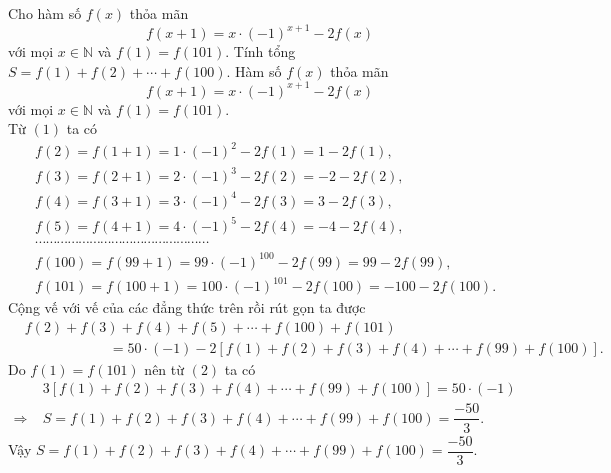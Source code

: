 \begin{vn}
Cho hàm số $f(x)$ thỏa mãn \[f(x+1)=x\cdot (-1)^{x+1}-2f(x)\] với mọi $x\in\mathbb{N}$ và $f(1)=f(101)$. Tính tổng $S=f(1)+f(2)+\cdots+f(100).$
\loigiai
{
Hàm số $f(x)$ thỏa mãn \[f(x+1)=x\cdot (-1)^{x+1}-2f(x)\tag{1}\] với mọi $x\in\mathbb{N}$ và $f(1)=f(101)$.\\
Từ $(1)$ ta có
{\allowdisplaybreaks
\begin{align*}
&f(2)=f(1+1)=1\cdot (-1)^{2}-2f(1)=1-2f(1),\\ 
&f(3)=f(2+1)=2\cdot (-1)^{3}-2f(2)=-2-2f(2),\\ 
&f(4)=f(3+1)=3\cdot (-1)^{4}-2f(3)=3-2f(3),\\ 
&f(5)=f(4+1)=4\cdot (-1)^{5}-2f(4)=-4-2f(4),\\ 
&\cdots\cdots\cdots\cdots\cdots\cdots\cdots\cdots\cdots\cdots\cdots\cdots\cdots\cdots\cdots\cdots\\
&f(100)=f(99+1)=99\cdot (-1)^{100}-2f(99)=99-2f(99),\\ 
&f(101)=f(100+1)=100\cdot (-1)^{101}-2f(100)=-100-2f(100).
\end{align*}}
Cộng vế với vế của các đẳng thức trên rồi rút gọn ta được
\begin{align*}
&f(2)+f(3)+f(4)+f(5)+\cdots+f(100)+f(101)\\ 
&\qquad\qquad\qquad=50\cdot (-1)-2\left[f(1)+f(2)+f(3)+f(4)+\cdots+f(99)+f(100)\right].\tag{2}
\end{align*}
Do $f(1)=f(101)$ nên từ $(2)$ ta có
\begin{align*}
&3\left[f(1)+f(2)+f(3)+f(4)+\cdots+f(99)+f(100)\right]=50\cdot (-1)\\
\Rightarrow\;&S=f(1)+f(2)+f(3)+f(4)+\cdots+f(99)+f(100)=\dfrac{-50}{3}.
\end{align*}
Vậy $S=f(1)+f(2)+f(3)+f(4)+\cdots+f(99)+f(100)=\dfrac{-50}{3}.$
}
\end{vn}

